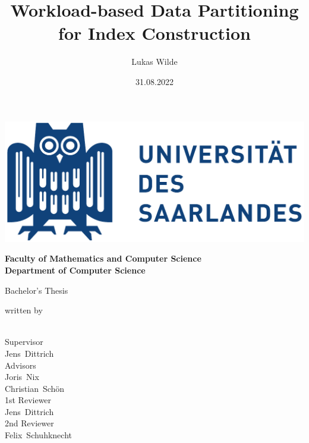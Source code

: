 \documentclass[11pt,a4paper,twoside,titlepage,british]{report}
\author{Lukas Wilde}
\date{31.08.2022}
\title{Workload-based Data Partitioning for Index Construction}
\makeatletter
\let\runauthor\@author
\let\runtitle\@title
\let\rundate\@date
\makeatother
\begin{document}
\begin{titlepage}
    \begin{center}
        \includegraphics[scale=.5]{figures/logo.pdf}

        \bfseries
        \vspace{2em}
        Faculty of Mathematics and Computer Science \\
        Department of Computer Science

        \vspace{2cm}
        \begin{doublespace}
            {\LARGE \runtitle}
        \end{doublespace}

        \vspace{1cm} 
        {\large Bachelor's Thesis}

        \vfill
        {\normalfont written by}
        \\[1em]
        {\Large \runauthor}
        \\[1em]
        \textbf{\printdate{\rundate}}

        \vfill
        {\normalfont Supervisor}
        \\
        {\large Jens~Dittrich}
        \\[.5em]
        {\normalfont Advisors}
        \\
        {\large Joris~Nix}
        \\
        {\large Christian~Schön}
        \\[.5em]
        {\normalfont 1st Reviewer}
        \\
        {\large Jens~Dittrich}
        \\[.5em]
        {\normalfont 2nd Reviewer}
        \\
        {\large Felix~Schuhknecht}
    \end{center}
\end{titlepage}
\setcounter{page}{2}
\end{document}
